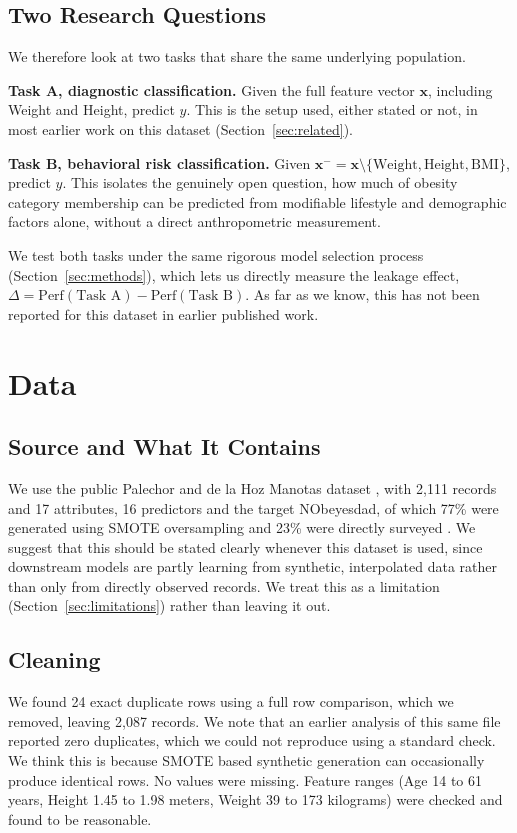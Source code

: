 \documentclass[journal]{IEEEtran}
\begin{document}
\subsection{Two Research Questions}
We therefore look at two tasks that share the same underlying population.

\textbf{Task A, diagnostic classification.} Given the full feature vector $\mathbf{x}$, including Weight and Height, predict $y$. This is the setup used, either stated or not, in most earlier work on this dataset (Section~\ref{sec:related}).

\textbf{Task B, behavioral risk classification.} Given $\mathbf{x}^{-} = \mathbf{x}\setminus\{\mathrm{Weight}, \mathrm{Height}, \mathrm{BMI}\}$, predict $y$. This isolates the genuinely open question, how much of obesity category membership can be predicted from modifiable lifestyle and demographic factors alone, without a direct anthropometric measurement.

We test both tasks under the same rigorous model selection process (Section~\ref{sec:methods}), which lets us directly measure the leakage effect, $\Delta = \mathrm{Perf}(\text{Task A}) - \mathrm{Perf}(\text{Task B})$. As far as we know, this has not been reported for this dataset in earlier published work.

\section{Data}
\label{sec:data}

\subsection{Source and What It Contains}
We use the public Palechor and de la Hoz Manotas dataset \cite{palechor2019dataset}, with 2{,}111 records and 17 attributes, 16 predictors and the target NObeyesdad, of which 77\% were generated using SMOTE oversampling and 23\% were directly surveyed \cite{palechor2019dataset, chawla2002smote}. We suggest that this should be stated clearly whenever this dataset is used, since downstream models are partly learning from synthetic, interpolated data rather than only from directly observed records. We treat this as a limitation (Section~\ref{sec:limitations}) rather than leaving it out.

\subsection{Cleaning}
We found 24 exact duplicate rows using a full row comparison, which we removed, leaving 2{,}087 records. We note that an earlier analysis of this same file reported zero duplicates, which we could not reproduce using a standard check. We think this is because SMOTE based synthetic generation can occasionally produce identical rows. No values were missing. Feature ranges (Age 14 to 61 years, Height 1.45 to 1.98 meters, Weight 39 to 173 kilograms) were checked and found to be reasonable.
\end{document}
